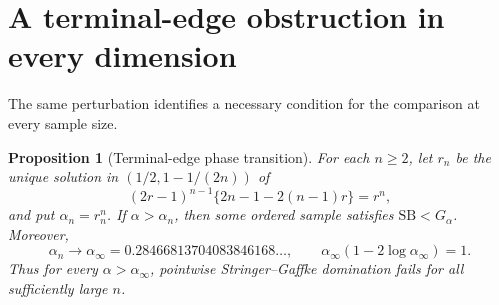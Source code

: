 \documentclass[11pt]{article}
\newtheorem{proposition}[theorem]{Proposition}
\theoremstyle{definition}
\newcommand{\SB}{\mathrm{SB}}
\begin{document}
\section{A terminal-edge obstruction in every dimension}

The same perturbation identifies a necessary condition for the comparison
at every sample size.

\begin{proposition}[Terminal-edge phase transition]
\label{prop:terminalbifurcation}
For each $n\ge2$, let $r_n$ be the unique solution in
$(1/2,1-1/(2n))$ of
\begin{equation}\label{eq:terminalcritical}
 (2r-1)^{n-1}\{2n-1-2(n-1)r\}=r^n,
\end{equation}
and put $\alpha_n=r_n^n$.  If $\alpha>\alpha_n$, then some ordered sample
satisfies $\SB<G_\alpha$.  Moreover,
\begin{equation}\label{eq:terminalcritical-limit}
 \alpha_n\longrightarrow\alpha_\infty
 =0.28466813704083846168\ldots,
 \qquad \alpha_\infty(1-2\log\alpha_\infty)=1.
\end{equation}
Thus for every $\alpha>\alpha_\infty$, pointwise Stringer--Gaffke
domination fails for all sufficiently large $n$.
\end{proposition}
\end{document}
